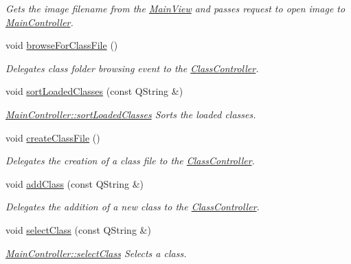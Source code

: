 \begin{DoxyCompactItemize}
\begin{DoxyCompactList}\small\item\em Gets the image filename from the \hyperlink{classMainView}{Main\+View} and passes request to open image to \hyperlink{classMainController}{Main\+Controller}. \end{DoxyCompactList}\item 
\mbox{\label{classMainController_aa717950c16ef5d01ab4edf77a9a27f82}} 
void \hyperlink{classMainController_aa717950c16ef5d01ab4edf77a9a27f82}{browse\+For\+Class\+File} ()
\begin{DoxyCompactList}\small\item\em Delegates class folder browsing event to the \hyperlink{classClassController}{Class\+Controller}. \end{DoxyCompactList}\item 
void \hyperlink{classMainController_a21e18cb936861042e1603c029f3c006e}{sort\+Loaded\+Classes} (const Q\+String \&)
\begin{DoxyCompactList}\small\item\em \hyperlink{classMainController_a21e18cb936861042e1603c029f3c006e}{Main\+Controller\+::sort\+Loaded\+Classes} Sorts the loaded classes. \end{DoxyCompactList}\item 
\mbox{\label{classMainController_a6cdee58a8c4ed59ab9a05ab5a15456a6}} 
void \hyperlink{classMainController_a6cdee58a8c4ed59ab9a05ab5a15456a6}{create\+Class\+File} ()
\begin{DoxyCompactList}\small\item\em Delegates the creation of a class file to the \hyperlink{classClassController}{Class\+Controller}. \end{DoxyCompactList}\item 
void \hyperlink{classMainController_aede8e00b0ad8f75018f6b62e1cb5e301}{add\+Class} (const Q\+String \&)
\begin{DoxyCompactList}\small\item\em Delegates the addition of a new class to the \hyperlink{classClassController}{Class\+Controller}. \end{DoxyCompactList}\item 
void \hyperlink{classMainController_aa2b2e86d0134c9bb413d74efdd926211}{select\+Class} (const Q\+String \&)
\begin{DoxyCompactList}\small\item\em \hyperlink{classMainController_aa2b2e86d0134c9bb413d74efdd926211}{Main\+Controller\+::select\+Class} Selects a class. \end{DoxyCompactList}\item 

\end{DoxyCompactItemize}
